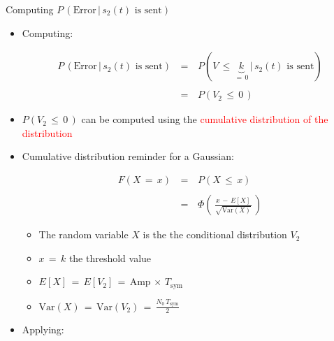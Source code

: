 \documentclass{Beamer}
\begin{document}
\begin{frame}[t,allowframebreaks]{Computing $P \, (\text{Error} \, | \, s_2(t) \text{ is sent})$}

\begin{itemize}

\item Computing:

\begin{equation}
\begin{array}{rcl}
P \, (\text{Error} \, | \, s_2(t) \text{ is sent}) \, &=& \, P (V \, \leq \, \underbrace{k}_{ = \, 0} \, | \, s_2(t) \text{ is sent}) \\ \\
&=& \, P (V_2 \, \leq \, 0 \,)
\end{array}
\end{equation}



\item $P (V_2 \, \leq \, 0 \,)$ can be computed using the \textcolor{red}{cumulative distribution of the distribution}

\newpage
\item Cumulative distribution reminder for a Gaussian:

\begin{equation}
\begin{array}{rcl}
F(X \, = \, x) \, &=& \, P(X \, \leq \, x) \\ \\
				  &=& \, \Phi \left(\, \displaystyle\frac{x \, - \, E[X]}{ \sqrt{\text{Var}(X)} } \, \right)
\end{array}	
\end{equation}

	\begin{itemize}
	
	\item The random variable $X$ is the the conditional distribution $V_2$	
	
	\item $x \, = \, k$ the threshold value
	
	\item $E[X] \, = \, E[V_2] \, = \, \text{Amp} \, \times \, T_{\text{sym}}$
	
	\item $ \text{Var}(X) \, = \, \text{Var}(V_2) \, = \, \displaystyle\frac{N_0 \, T_{\text{sym}}}{2}$
	\end{itemize}

\newpage
\item Applying:


\end{itemize}
\end{frame}
\end{document}
